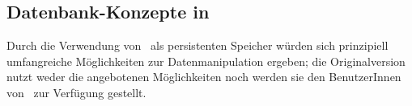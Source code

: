 \subsection{Datenbank-Konzepte in \protect\soh}
%
Durch die Verwendung von \postgres\ als persistenten Speicher w\"{u}rden
sich prinzipiell umfangreiche M\"{o}glichkeiten zur Datenmanipulation
ergeben; die Originalversion nutzt weder die angebotenen
M\"{o}glichkeiten noch werden sie den BenutzerInnen von \soh\ zur
Verf\"{u}gung gestellt.
%
%
%
%
%
%
%
%
%
